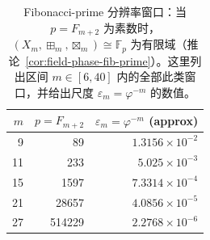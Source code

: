 \begin{table}[H]
\centering
\scriptsize
\setlength{\tabcolsep}{6pt}
\caption{Fibonacci-prime 分辨率窗口：当 $p=F_{m+2}$ 为素数时，$(X_m,\boxplus_m,\boxtimes_m)\cong \mathbb{F}_p$ 为有限域（推论~\ref{cor:field-phase-fib-prime}）。这里列出区间 $m\in[6,40]$ 内的全部此类窗口，并给出尺度 $\varepsilon_m=\varphi^{-m}$ 的数值。}
\label{tab:fib_prime_resolution_windows}
\begin{tabular}{r r r}
\toprule
$m$ & $p=F_{m+2}$ & $\varepsilon_m=\varphi^{-m}$ (approx)\\
\midrule
9 & 89 & $1.3156\times 10^{-2}$\\
11 & 233 & $5.025\times 10^{-3}$\\
15 & 1597 & $7.3314\times 10^{-4}$\\
21 & 28657 & $4.0856\times 10^{-5}$\\
27 & 514229 & $2.2768\times 10^{-6}$\\
\bottomrule
\end{tabular}
\end{table}

